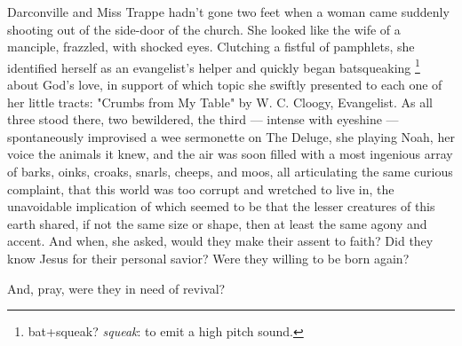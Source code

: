   Darconville and Miss Trappe hadn't gone two feet when a woman came suddenly
shooting out of the side-door of the church. She looked like the wife of a
manciple, 
frazzled, 
with shocked eyes. Clutching 
a fistful of pamphlets, she
identified herself as an evangelist's helper and quickly began batsqueaking
\footnote{ bat+squeak? \textit{squeak}: to emit a high pitch sound.}
about God's love, in support of which topic she swiftly presented to each one of
her little tracts: "Crumbs 
from My Table" by W. C. Cloogy, Evangelist. As all
three stood there, two bewildered, the third --- intense with eyeshine --- 
spontaneously improvised a wee 
sermonette 
on The Deluge, 
she playing Noah, her voice the animals it knew, and the air was soon filled with 
a most ingenious array of barks, oinks, 
croaks, 
snarls, 
cheeps, 
and moos, 
all articulating 
the same curious complaint, that this world was too corrupt and wretched to live 
in, the unavoidable implication of which seemed to be that the lesser creatures 
of this earth shared, if not the same size or shape, then at least the same 
agony and accent. And when, she asked, would they make their assent to faith? 
Did they know Jesus for their personal savior? Were they willing to be born 
again?

  And, pray, were they in need of revival?

